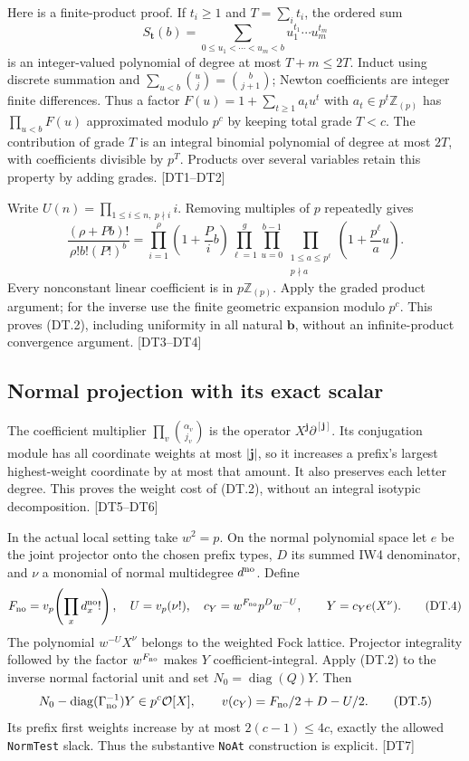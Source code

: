 \documentclass[11pt,a4paper]{article}
\numberwithin{equation}{section}
\theoremstyle{remark}\newtheorem{remark}[theorem]{Remark}
\begin{document}
Here is a finite-product proof. If $t_i\ge1$ and $T=\sum_i t_i$, the ordered sum
\[
 S_{\mathbf t}(b)=\sum_{0\le u_1<\cdots<u_m<b}u_1^{t_1}\cdots u_m^{t_m}
\]
is an integer-valued polynomial of degree at most $T+m\le2T$. Induct using discrete summation and $\sum_{u<b}\binom uj=\binom b{j+1}$; Newton coefficients are integer finite differences. Thus a factor $F(u)=1+\sum_{t\ge1}a_tu^t$ with $a_t\in p^t\mathbb Z_{(p)}$ has
$\prod_{u<b}F(u)$ approximated modulo $p^c$ by keeping total grade $T<c$. The contribution of grade $T$ is an integral binomial polynomial of degree at most $2T$, with coefficients divisible by $p^T$. Products over several variables retain this property by adding grades. \textsf{[DT1--DT2]}

Write $U(n)=\prod_{1\le i\le n,\ p\nmid i}i$. Removing multiples of $p$ repeatedly gives
\[
 \frac{(\rho+Pb)!}{\rho!b!(P!)^b}
 =\prod_{i=1}^{\rho}\left(1+\frac{P}{i}b\right)
  \prod_{\ell=1}^{g}\prod_{u=0}^{b-1}
       \prod_{\substack{1\le a\le p^\ell\\p\nmid a}}
            \left(1+\frac{p^\ell}{a}u\right).
 \tag{DT.3}
\]
Every nonconstant linear coefficient is in $p\mathbb Z_{(p)}$. Apply the graded product argument; for the inverse use the finite geometric expansion modulo $p^c$. This proves (DT.2), including uniformity in all natural $\mathbf b$, without an infinite-product convergence argument. \textsf{[DT3--DT4]}\cite{digit-approximation}

\subsection{Normal projection with its exact scalar}

The coefficient multiplier $\prod_v\binom{\alpha_v}{j_v}$ is the operator
$X^{\mathbf j}\partial^{[\mathbf j]}$. Its conjugation module has all coordinate weights at most $|\mathbf j|$, so it increases a prefix's largest highest-weight coordinate by at most that amount. It also preserves each letter degree. This proves the weight cost of (DT.2), without an integral isotypic decomposition. \textsf{[DT5--DT6]}

In the actual local setting take $w^2=p$. On the normal polynomial space let $e$ be the joint projector onto the chosen prefix types, $D$ its summed IW4 denominator, and $\nu$ a monomial of normal multidegree $d^{\rm no}$. Define
\[
 F_{\rm no}=v_p\!\left(\prod_xd_x^{\rm no}!\right),\quad U=v_p(\nu!),\quad
 c_Y=w^{F_{\rm no}}p^Dw^{-U},\qquad Y=c_Ye(X^\nu).
 \tag{DT.4}
\]
The polynomial $w^{-U}X^\nu$ belongs to the weighted Fock lattice. Projector integrality followed by the factor $w^{F_{\rm no}}$ makes $Y$ coefficient-integral. Apply (DT.2) to the inverse normal factorial unit and set $N_0=\operatorname{diag}(Q)Y$. Then
\[
 N_0-\operatorname{diag}(\Gamma_{\rm no}^{-1})Y
       \in p^c\mathcal O[X],\qquad
 v(c_Y)=F_{\rm no}/2+D-U/2.
 \tag{DT.5}
\]
Its prefix first weights increase by at most $2(c-1)\le4c$, exactly the allowed \texttt{NormTest} slack. Thus the substantive \texttt{NoAt} construction is explicit. \textsf{[DT7]}
\end{document}
